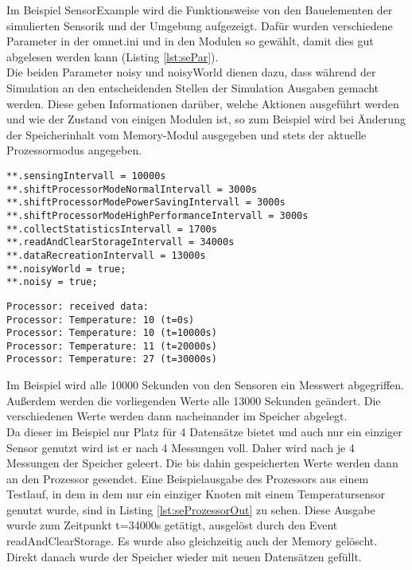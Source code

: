 Im Beispiel SensorExample wird die Funktionsweise von den Bauelementen der simulierten Sensorik und der Umgebung aufgezeigt. Dafür wurden verschiedene Parameter in der omnet.ini und in den Modulen so gewählt, damit dies gut abgelesen werden kann (Listing \ref{lst:sePar}).\\
Die beiden Parameter noisy und noisyWorld dienen dazu, dass während der Simulation an den entscheidenden Stellen der Simulation Ausgaben gemacht werden. Diese geben Informationen darüber, welche Aktionen ausgeführt werden und wie der Zustand von einigen Modulen ist, so zum Beispiel wird bei Änderung der Speicherinhalt vom Memory-Modul ausgegeben und stets der aktuelle Prozessormodus angegeben.\\
\begin{minipage}{\textwidth}
\begin{lstlisting}[language=ned,caption={Parameter für das Beispiel SensorExample},label=lst:sePar]
**.sensingIntervall = 10000s
**.shiftProcessorModeNormalIntervall = 3000s
**.shiftProcessorModePowerSavingIntervall = 3000s
**.shiftProcessorModeHighPerformanceIntervall = 3000s
**.collectStatisticsIntervall = 1700s
**.readAndClearStorageIntervall = 34000s
**.dataRecreationIntervall = 13000s
**.noisyWorld = true;
**.noisy = true; 
\end{lstlisting}
\end{minipage}
\begin{minipage}{\textwidth}
\begin{lstlisting}[language=ned,caption={Ausgabe des Speicherinhalts durch den Prozessor bei t=40000s},label=lst:seProzessorOut]
Processor: received data:
Processor: Temperature: 10 (t=0s)
Processor: Temperature: 10 (t=10000s)
Processor: Temperature: 11 (t=20000s)
Processor: Temperature: 27 (t=30000s)
\end{lstlisting}
\end{minipage}
Im Beispiel wird alle 10000 Sekunden von den Sensoren ein Messwert abgegriffen. Außerdem werden die vorliegenden Werte alle 13000 Sekunden geändert. Die verschiedenen Werte werden dann nacheinander im Speicher abgelegt.\\
Da dieser im Beispiel nur Platz für 4 Datensätze bietet und auch nur ein einziger Sensor genutzt wird ist er nach 4 Messungen voll. Daher wird nach je 4 Messungen der Speicher geleert. Die bis dahin gespeicherten Werte werden dann an den Prozessor gesendet. Eine Beispielausgabe des Prozessors aus einem Testlauf, in dem in dem nur ein einziger Knoten mit einem Temperatursensor genutzt wurde, sind in Listing \ref{lst:seProzessorOut} zu sehen. Diese Ausgabe wurde zum Zeitpunkt t=34000s getätigt, ausgelöst durch den Event readAndClearStorage. Es wurde also gleichzeitig auch der Memory gelöscht. Direkt danach wurde der Speicher wieder mit neuen Datensätzen gefüllt.\\
